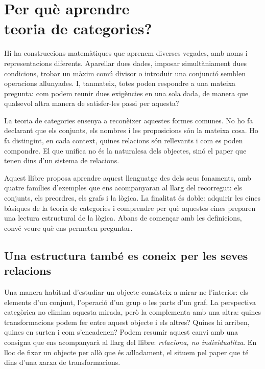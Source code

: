 \chapter*{\texorpdfstring{Per què aprendre\\ teoria de categories?}{Per què aprendre teoria de categories?}}

\begingroup
\renewcommand{\thesection}{\arabic{section}}
\setcounter{section}{0}
\setlength{\emergencystretch}{1.5em}

Hi ha construccions matemàtiques que aprenem diverses vegades, amb noms i
representacions diferents. Aparellar dues dades, imposar simultàniament dues
condicions, trobar un màxim comú divisor o introduir una conjunció semblen
operacions allunyades. I, tanmateix, totes poden respondre a una mateixa
pregunta: com podem reunir dues exigències en una sola dada, de manera que
qualsevol altra manera de satisfer-les passi per aquesta?

La teoria de categories ensenya a reconèixer aquestes formes comunes. No ho
fa declarant que els conjunts, els nombres i les proposicions són la mateixa
cosa. Ho fa distingint, en cada context, quines relacions són rellevants i
com es poden compondre. El que unifica no és la naturalesa dels objectes,
sinó el paper que tenen dins d'un sistema de relacions.

Aquest llibre proposa aprendre aquest llenguatge des dels seus fonaments,
amb quatre famílies d'exemples que ens acompanyaran al llarg del recorregut:
els conjunts, els preordres, els grafs i la lògica. La finalitat és doble:
adquirir les eines bàsiques de la teoria de categories i comprendre per què
aquestes eines preparen una lectura estructural de la lògica. Abans de
començar amb les definicions, convé veure què ens permeten preguntar.

\section{Una estructura també es coneix per les seves relacions}
\label{sec:mirar-fora}

Una manera habitual d'estudiar un objecte consisteix a mirar-ne l'interior:
els elements d'un conjunt, l'operació d'un grup o les parts d'un graf. La
perspectiva categòrica no elimina aquesta mirada, però la complementa amb
una altra: quines transformacions podem fer entre aquest objecte i els
altres? Quines hi arriben, quines en surten i com s'encadenen?
Podem resumir aquest canvi amb una consigna que ens acompanyarà al llarg
del llibre: \emph{relaciona, no individualitza}. En lloc de fixar un
objecte per allò que és aïlladament, el situem pel paper que té dins
d'una xarxa de transformacions.

